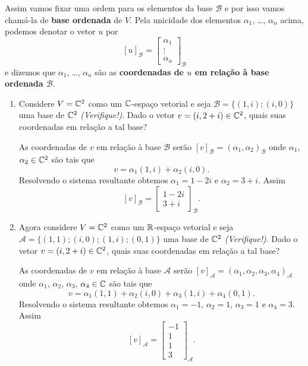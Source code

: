 Assim vamos fixar uma ordem para os elementos da base $\mathcal{B}$ e por isso vamos cham\'a-la de \textbf{base ordenada} de $V$. Pela unicidade dos elementos $\alpha_1$, \dots, $\alpha_n$ acima, podemos denotar o vetor $u$ por
\[
	[u]_\mathcal{B} = \begin{bmatrix}
		\alpha_1\\
		\vdots\\
		\alpha_n
	\end{bmatrix}_\mathcal{B}
\]
e dizemos que $\alpha_1$, \dots, $\alpha_n$ s\~ao as \textbf{coordenadas de $u$ em rela\c{c}\~ao \`a base ordenada $\mathcal{B}$}.

\begin{exemplos}
	\begin{enumerate}
		\item Considere $V = \mathbb{C}^2$ como um $\mathbb{C}$-espa\c{c}o vetorial e seja $\mathcal{B} = \{(1,i);(i,0)\}$ uma base de $\mathbb{C}^2$ \textit{(Verifique!)}. Dado o vetor $v = (i, 2+i) \in \mathbb{C}^2$, quais suas coordenadas em rela\c{c}\~ao a tal base?
		\begin{solucao}
			As coordenadas de $v$ em rela\c{c}\~ao \`a base $\mathcal{B}$ ser\~ao $[v]_\mathcal{B} = (\alpha_1,\alpha_2)_\mathcal{B}$ onde $\alpha_1$, $\alpha_2 \in \mathbb{C}^2$ s\~ao tais que
			\[
				v = \alpha_1(1,i) + \alpha_2(i,0).
			\]
			Resolvendo o sistema resultante obtemos $\alpha_1 = 1 - 2i$ e $\alpha_2 = 3 + i$. Assim
			\[
				[v]_\mathcal{B} = \begin{bmatrix}
					1 - 2i\\
					3 + i
				\end{bmatrix}_\mathcal{B}.
			\]
		\end{solucao}

		\item Agora considere $V = \mathbb{C}^2$ como um $\mathbb{R}$-espa\c{c}o vetorial e seja $\mathcal{A} = \{(1,1);(i,0);(1,i);(0,1)\}$ uma base de $\mathbb{C}^2$ \textit{(Verifique!)}. Dado o vetor $v = (i,2+i) \in \mathbb{C}^2$, quais suas coordenadas em rela\c{c}\~ao a tal base?
		\begin{solucao}
			As coordenadas de $v$ em rela\c{c}\~ao \`a base $\mathcal{A}$ ser\~ao $[v]_\mathcal{A} = (\alpha_1,\alpha_2,\alpha_3,\alpha_4)_\mathcal{A}$ onde $\alpha_1$, $\alpha_2$, $\alpha_3$, $\alpha_4 \in \mathbb{C}$ s\~ao tais que
			\[
				v = \alpha_1(1,1) + \alpha_2(i,0) + \alpha_3(1,i) + \alpha_4(0,1).
			\]
			Resolvendo o sistema resultante obtemos $\alpha_1 = -1$, $\alpha_2 = 1$, $\alpha_3 = 1$ e $\alpha_4 = 3$. Assim
			\[
				[v]_\mathcal{A} = \begin{bmatrix}
					-1\\
					1\\
					1\\
					3
				\end{bmatrix}_\mathcal{A}.
			\]
		\end{solucao}
	\end{enumerate}
\end{exemplos}


